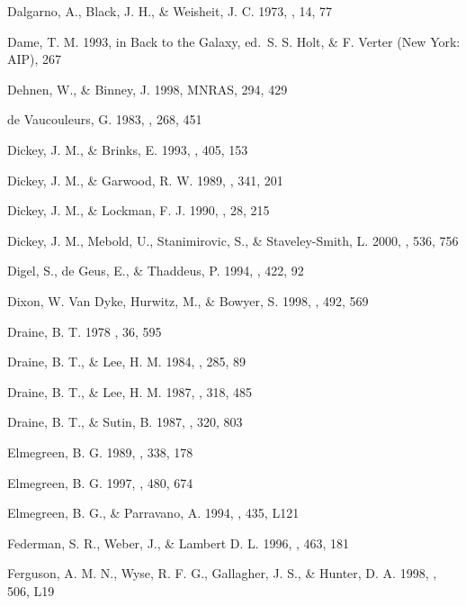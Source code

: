 \documentclass[12pt,preprint,flushrt]{aastex}
\begin{document}
\begin{thebibliography}{}
Dalgarno, A., Black, J. H.,
\& Weisheit, J. C. 1973, \aplett, 14, 77

Dame, T. M. 1993, in Back to the Galaxy,
ed.\ S. S. Holt, \& F. Verter (New York: AIP),  267

Dehnen, W., \& Binney, J.
1998, MNRAS, 294, 429

de Vaucouleurs, G. 1983, \apj, 268,
451

Dickey, J. M., \& Brinks, E. 1993,
\apj, 405, 153

Dickey, J. M., \& Garwood, R. W. 1989,
\apj, 341, 201

 Dickey, J. M., \& Lockman, F. J. 1990,
    \araa, 28, 215

Dickey, J. M., Mebold, U.,
Stanimirovic, S., \& Staveley-Smith, L. 2000, \apj, 536, 756

Digel, S., de Geus, E.,
\& Thaddeus, P. 1994, \apj, 422, 92

Dixon, W. Van Dyke, Hurwitz,
M., \& Bowyer, S. 1998, \apj, 492, 569

Draine, B. T. 1978 \apjs, 36, 595

Draine, B. T., \& Lee, H. M. 1984,
\apj, 285, 89

Draine, B. T., \& Lee, H. M. 1987,
\apj, 318, 485

Draine, B. T., \& Sutin, B. 1987,
\apj, 320, 803

Elmegreen, B. G. 1989, \apj, 338, 178

Elmegreen, B. G. 1997, \apj, 480, 674

Elmegreen, B. G., \& Parravano, A. 1994, \apj, 435, L121

Federman, S. R., Weber, J.,
\& Lambert D. L. 1996, \apj, 463, 181

Ferguson, A. M. N., Wyse,
R. F. G., Gallagher, J. S., \& Hunter, D. A. 1998, \apj, 506, L19


\end{thebibliography}
\end{document}
